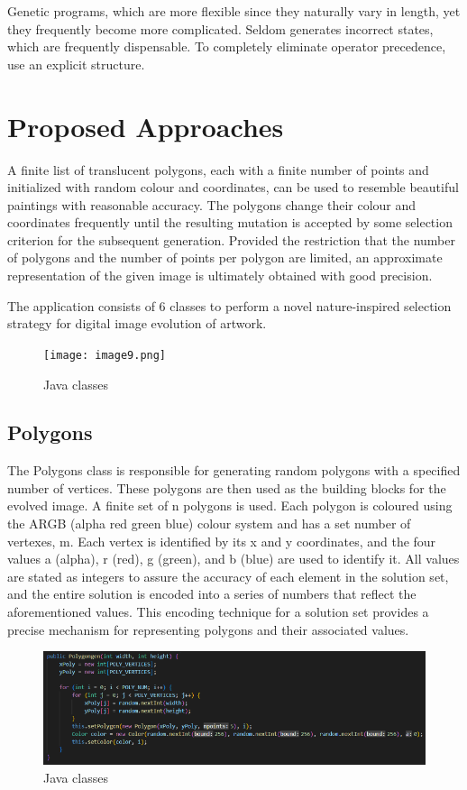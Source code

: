 Genetic programs, which are more flexible since they naturally vary in length, yet they frequently become more complicated. Seldom generates incorrect states, which are frequently dispensable. To completely eliminate operator precedence, use an explicit structure.

\section{Proposed Approaches}
\label{proposed-approaches}
A finite list of translucent polygons, each with a finite number of points and initialized with random colour and coordinates, can be used to resemble beautiful paintings with reasonable accuracy. The polygons change their colour and coordinates frequently until the resulting mutation is accepted by some selection criterion for the subsequent
generation. Provided the restriction that the number of polygons and the
number of points per polygon are limited, an approximate representation
of the given image is ultimately obtained with good precision.

The application consists of 6 classes to perform a novel nature-inspired
selection strategy for digital image evolution of artwork.
\begin{figure}
\centering
\texttt{[image: image9.png]}
\caption{Java classes}
\end{figure}

\subsection{Polygons}
\label{Polygons}
The Polygons class is responsible for generating random polygons with a specified number of vertices. These polygons are then used as the building blocks for the evolved image. A finite set of n polygons is used. Each polygon is coloured using the ARGB (alpha red green blue) colour system and has a set number of vertexes, m. Each vertex is identified by its x and y coordinates, and the four values a (alpha), r (red), g (green), and b (blue) are used to identify it. All values are stated as integers to assure the accuracy of each element in the solution set, and the entire solution is encoded into a series of numbers that reflect the aforementioned values. This encoding technique for a solution set provides a precise mechanism for representing polygons and their
associated values.
\begin{figure} 
\centering
\includegraphics[width=4.5in]{images/polygons 1.png}
\caption{Java classes}
\end{figure}
\clearpage

